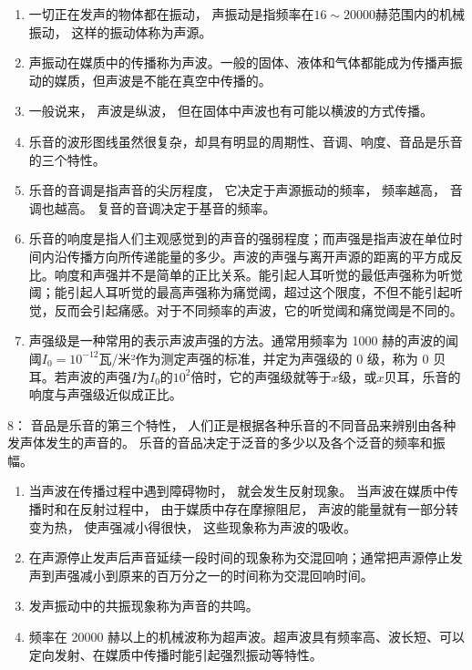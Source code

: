 \begin{enumerate}
\def\labelenumi{\arabic{enumi}.}
\item
  一切正在发声的物体都在振动，
  声振动是指频率在\(16 \sim 20000\)赫范围内的机械振动，
  这样的振动体称为声源。
\item
  声振动在媒质中的传播称为声波。一般的固体、液体和气体都能成为传播声振动的媒质，但声波是不能在真空中传播的。
\item
  一般说来， 声波是纵波， 但在固体中声波也有可能以横波的方式传播。
\item
  乐音的波形图线虽然很复杂，却具有明显的周期性、音调、响度、音品是乐音的三个特性。
\item
  乐音的音调是指声音的尖厉程度， 它决定于声源振动的频率， 频率越高，
  音调也越高。 复音的音调决定于基音的频率。
\item
  乐音的响度是指人们主观感觉到的声音的强弱程度；而声强是指声波在单位时间内沿传播方向所传递能量的多少。声波的声强与离开声源的距离的平方成反比。响度和声强并不是简单的正比关系。能引起人耳听觉的最低声强称为听觉阈；能引起人耳听觉的最高声强称为痛觉阈，超过这个限度，不但不能引起听觉，反而会引起痛感。对于不同频率的声波，它的听觉阈和痛觉阈是不同的。
\item
  声强级是一种常用的表示声波声强的方法。通常用频率为 1000
  赫的声波的闻阈\(I_0 = 10^{-12}\)瓦/米²作为测定声强的标准，并定为声强级的
  0 级，称为 0
  贝耳。若声波的声强\(I\)为\(I_0\)的\(10^2\)倍时，它的声强级就等于\(x\)级，或\(x\)贝耳，乐音的响度与声强级近似成正比。
\end{enumerate}

8： 音品是乐音的第三个特性，
人们正是根据各种乐音的不同音品来辨别由各种发声体发生的声音的。
乐音的音品决定于泛音的多少以及各个泛音的频率和振幅。

\begin{enumerate}
\def\labelenumi{\arabic{enumi}.}
\setcounter{enumi}{8}
\item
  当声波在传播过程中遇到障碍物时， 就会发生反射现象。
  当声波在媒质中传播时和在反射过程中， 由于媒质中存在摩擦阻尼，
  声波的能量就有一部分转变为热， 使声强减小得很快，
  这些现象称为声波的吸收。
\item
  在声源停止发声后声音延续一段时间的现象称为交混回响；通常把声源停止发声到声强减小到原来的百万分之一的时间称为交混回响时间。
\item
  发声振动中的共振现象称为声音的共鸣。
\item
  频率在 20000
  赫以上的机械波称为超声波。超声波具有频率高、波长短、可以定向发射、在媒质中传播时能引起强烈振动等特性。
\end{enumerate}


